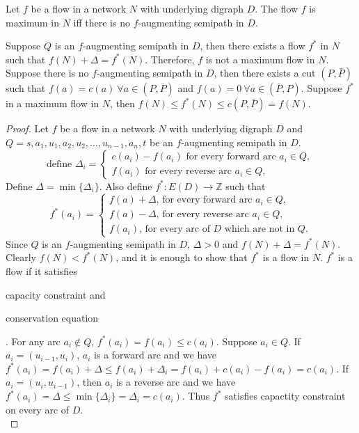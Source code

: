 \begin{theorem}
	Let $f$ be a flow in a network $N$ with underlying digraph $D$.
	The flow $f$ is maximum in $N$ iff there is no $f$-augmenting semipath in $D$.
\end{theorem}
\begin{synopsis}
	Suppose $Q$ is an $f$-augmenting semipath in $D$, then there exists a flow $f^*$ in $N$ such that $f(N)+\Delta = f^*(N)$.
	Therefore, $f$ is not a maximum flow in $N$.
	Suppose there is no $f$-augmenting semipath in $D$, then there exists a cut $(P,\bar{P})$ such that $f(a) = c(a)\ \forall a \in (P,\bar{P})$ and $f(a) = 0\ \forall a \in (\bar{P},P)$.
	Suppose $f^*$ in a maximum flow in $N$, then $f(N) \le f^*(N) \le c(P,\bar{P}) = f(N)$.
\end{synopsis}
\begin{proof}
	Let $f$ be a flow in a network $N$ with underlying digraph $D$ and $Q = s, a_1, u_1, a_2, u_2, \dots, u_{n-1}, a_n, t$ be an $f$-augmenting semipath in $D$.
	\[\text{define } \Delta_i = \begin{cases}
		c(a_i) - f(a_i) \text{ for every forward arc } a_i \in Q, \\
		f(a_i) \text{ for every reverse arc } a_i \in Q,
	\end{cases} \]
	Define $\Delta = \min \{ \Delta_i \}$.
	Also define $f^* : E(D) \to \mathbb{Z}$ such that 
	\[ f^*(a_i) = \begin{cases} f(a) + \Delta \text{, for every forward arc } a_i \in Q, \\
	f(a) - \Delta \text{, for every reverse arc } a_i \in Q, \\
	f(a_i) \text{, for every arc of } D \text{ which are not in }Q.
	\end{cases} \]
		Since $Q$ is an $f$-augmenting semipath in $D$, $\Delta > 0$ and $f(N) + \Delta = f^*(N)$.\\

	Clearly $f(N) < f^*(N)$, and it is enough to show that $f^*$ is a flow in $N$.
$f^*$ is a flow if it satisfies \begin{enumerate*} \item capacity constraint and \item conservation equation \end{enumerate*}.
			For any arc $a_i \notin Q$, $f^*(a_i) = f(a_i) \le c(a_i)$.
			Suppose $a_i \in Q$.
			If $a_i = (u_{i-1},u_i)$, $a_i$ is a forward arc and we have $f^*(a_i) = f(a_i) + \Delta \le f(a_i) + \Delta_i = f(a_i) + c(a_i) - f(a_i) = c(a_i)$.
			If $a_i = (u_i,u_{i-1})$, then $a_i$ is a reverse arc and we have $f^*(a_i) = \Delta \le \min \{ \Delta_i \} = \Delta_i = c(a_i)$.
			Thus $f^*$ satisfies capactity constraint on every arc of $D$.\\


\end{proof}
